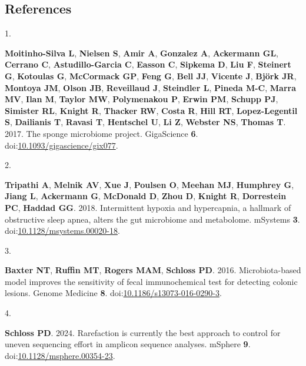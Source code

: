 \documentclass[
  11pt,
]{article}
\newlength{\cslhangindent}
\newlength{\csllabelwidth}
\newenvironment{CSLReferences}[2] %
 {\begin{list}{}{%
  \setlength{\itemindent}{0pt}
  \setlength{\leftmargin}{0pt}
  \setlength{\parsep}{0pt}
  \ifodd #1
   \setlength{\leftmargin}{\cslhangindent}
   \setlength{\itemindent}{-1\cslhangindent}
  \fi
  \setlength{\itemsep}{#2\baselineskip}}}
 {\end{list}}
\newcommand{\CSLLeftMargin}[1]{\parbox[t]{\csllabelwidth}{\strut#1\strut}}
\newcommand{\CSLRightInline}[1]{\parbox[t]{\linewidth - \csllabelwidth}{\strut#1\strut}}
\begin{document}
\newpage{}

\subsection*{References}\label{references}

\label{refs}
\begin{CSLReferences}{0}{1}
\CSLLeftMargin{1. }%
\CSLRightInline{\textbf{Moitinho-Silva L}, \textbf{Nielsen S},
\textbf{Amir A}, \textbf{Gonzalez A}, \textbf{Ackermann GL},
\textbf{Cerrano C}, \textbf{Astudillo-Garcia C}, \textbf{Easson C},
\textbf{Sipkema D}, \textbf{Liu F}, \textbf{Steinert G},
\textbf{Kotoulas G}, \textbf{McCormack GP}, \textbf{Feng G},
\textbf{Bell JJ}, \textbf{Vicente J}, \textbf{Björk JR}, \textbf{Montoya
JM}, \textbf{Olson JB}, \textbf{Reveillaud J}, \textbf{Steindler L},
\textbf{Pineda M-C}, \textbf{Marra MV}, \textbf{Ilan M}, \textbf{Taylor
MW}, \textbf{Polymenakou P}, \textbf{Erwin PM}, \textbf{Schupp PJ},
\textbf{Simister RL}, \textbf{Knight R}, \textbf{Thacker RW},
\textbf{Costa R}, \textbf{Hill RT}, \textbf{Lopez-Legentil S},
\textbf{Dailianis T}, \textbf{Ravasi T}, \textbf{Hentschel U},
\textbf{Li Z}, \textbf{Webster NS}, \textbf{Thomas T}. 2017. The sponge
microbiome project. GigaScience \textbf{6}.
doi:\href{https://doi.org/10.1093/gigascience/gix077}{10.1093/gigascience/gix077}.}

\CSLLeftMargin{2. }%
\CSLRightInline{\textbf{Tripathi A}, \textbf{Melnik AV}, \textbf{Xue J},
\textbf{Poulsen O}, \textbf{Meehan MJ}, \textbf{Humphrey G},
\textbf{Jiang L}, \textbf{Ackermann G}, \textbf{McDonald D},
\textbf{Zhou D}, \textbf{Knight R}, \textbf{Dorrestein PC},
\textbf{Haddad GG}. 2018. Intermittent hypoxia and hypercapnia, a
hallmark of obstructive sleep apnea, alters the gut microbiome and
metabolome. mSystems \textbf{3}.
doi:\href{https://doi.org/10.1128/msystems.00020-18}{10.1128/msystems.00020-18}.}

\CSLLeftMargin{3. }%
\CSLRightInline{\textbf{Baxter NT}, \textbf{Ruffin MT}, \textbf{Rogers
MAM}, \textbf{Schloss PD}. 2016. Microbiota-based model improves the
sensitivity of fecal immunochemical test for detecting colonic lesions.
Genome Medicine \textbf{8}.
doi:\href{https://doi.org/10.1186/s13073-016-0290-3}{10.1186/s13073-016-0290-3}.}

\CSLLeftMargin{4. }%
\CSLRightInline{\textbf{Schloss PD}. 2024. Rarefaction is currently the
best approach to control for uneven sequencing effort in amplicon
sequence analyses. mSphere \textbf{9}.
doi:\href{https://doi.org/10.1128/msphere.00354-23}{10.1128/msphere.00354-23}.}


\end{CSLReferences}
\end{document}
